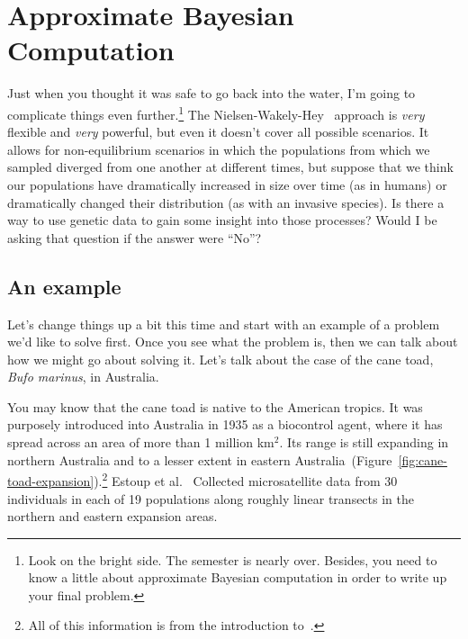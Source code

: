 \chapter{Approximate Bayesian Computation}

Just when you thought it was safe to go back into the water, I'm going
to complicate things even further.\footnote{Look on the bright
  side. The semester is nearly over. Besides, you need to know a
  little about approximate Bayesian computation in order to write up
  your final problem.} The
Nielsen-Wakely-Hey~\cite{Nielsen-Wakeley-2001,Hey-Nielsen-2004,Hey-Nielsen-2007}
approach is {\it very\/} flexible and {\it very\/} powerful, but even
it doesn't cover all possible scenarios. It allows for non-equilibrium
scenarios in which the populations from which we sampled diverged from
one another at different times, but suppose that we think our
populations have dramatically increased in size over time (as in
humans) or dramatically changed their distribution (as with an
invasive species). Is there a way to use genetic data to gain some
insight into those processes? Would I be asking that question if the
answer were ``No''?

\section*{An example}

Let's change things up a bit this time and start with an example of a
problem we'd like to solve first. Once you see what the problem is,
then we can talk about how we might go about solving it. Let's talk
about the case of the cane toad, {\it Bufo marinus}, in Australia.

You may know that the cane toad is native to the American tropics. It
was purposely introduced into Australia in 1935 as a biocontrol agent,
where it has spread across an area of more than 1 million km$^2$. Its
range is still expanding in northern Australia and to a lesser extent
in eastern
Australia~(Figure~\ref{fig:cane-toad-expansion}).\footnote{All of this
  information is from the introduction to~\cite{Estoup-etal-2004}.}
Estoup et al.~\cite{Estoup-etal-2004} Collected microsatellite data
from 30 individuals in each of 19 populations along roughly linear
transects in the northern and eastern expansion areas.

